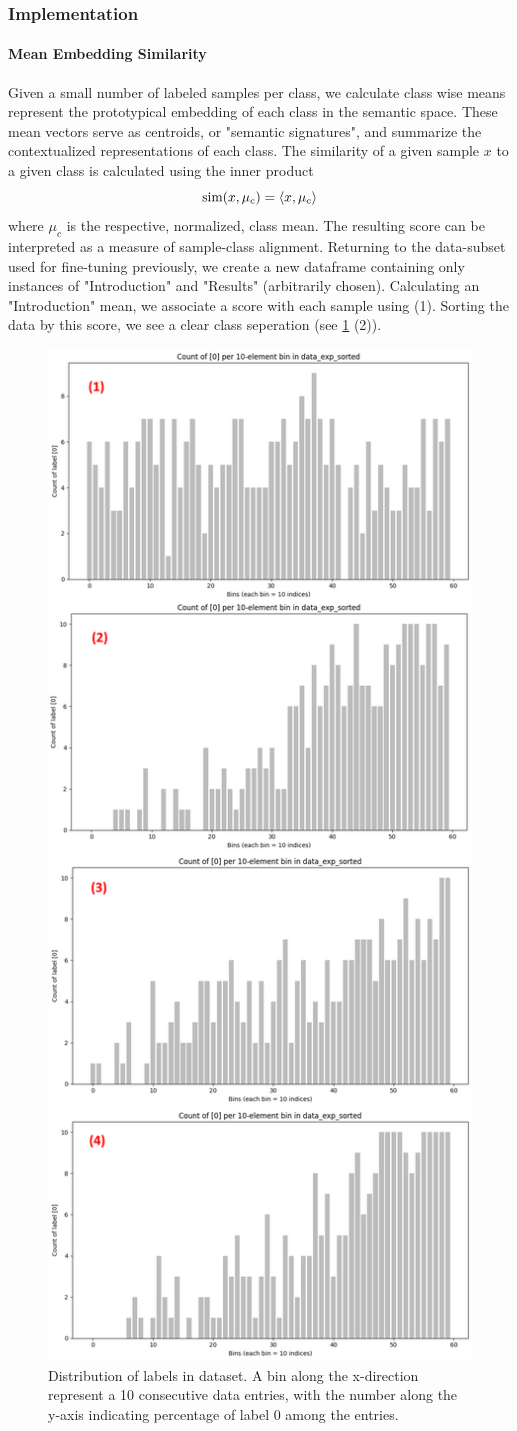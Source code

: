 \subsubsection{Implementation}
\paragraph{Mean Embedding Similarity}
Given a small number of labeled samples per class, we calculate class wise means represent the prototypical embedding of each class in the semantic space. These mean vectors serve as centroids, or "semantic signatures", and summarize the contextualized representations of each class. The similarity of a given sample $x$ to a given class is calculated using the inner product
\begin{equation}
    \text{sim}(x, \mu_{c}) = \braket{x, \mu_c}
\end{equation}
where $\mu_c$ is the respective, normalized, class mean. The resulting score can be interpreted as a measure of sample-class alignment. Returning to the data-subset used for fine-tuning previously, we create a new dataframe containing only instances of "Introduction" and "Results" (arbitrarily chosen). Calculating an "Introduction" mean, we associate a score with each sample using (1). Sorting the data by this score, we see a clear class seperation (see \cref{fig:102} (2)).

\begin{figure}%
    \centering
    \includegraphics[width=0.5\linewidth]{media/score_sorting.png}
    \caption{Distribution of labels in dataset. A bin along the x-direction represent a 10 consecutive data entries, with the number along the y-axis indicating percentage of label 0 among the entries.}
    \label{fig:102}
\end{figure}

